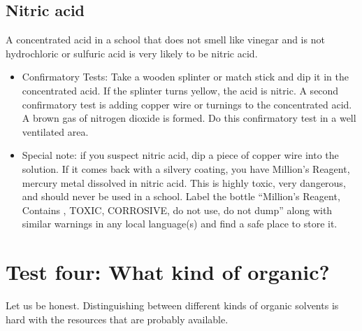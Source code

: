 \subsection{Nitric acid}
A concentrated acid in a school that does not smell like vinegar 
and is not hydrochloric or sulfuric acid is very likely to be nitric acid. 

\begin{itemize}

\item{Confirmatory Tests: Take a wooden splinter 
or match stick and dip it in the concentrated acid. 
If the splinter turns yellow, 
the acid is nitric. 
A second confirmatory test is adding copper wire 
or turnings to the concentrated acid. 
A brown gas of nitrogen dioxide is formed. 
Do this confirmatory test in a well ventilated area.}

\item{Special note: if you suspect nitric acid, 
dip a piece of copper wire into the solution. 
If it comes back with a silvery coating, 
you have Million’s Reagent, 
mercury metal dissolved in nitric acid. 
This is highly toxic, 
very dangerous, 
and should never be used in a school. 
Label the bottle “Million’s Reagent, 
Contains , 
TOXIC, 
CORROSIVE, 
do not use, 
do not dump” along with similar warnings 
in any local language(s) and find a safe place to store it.}

\end{itemize}

\section{Test four: What kind of organic?}
\label{sec:testorganic}
Let us be honest. 
Distinguishing between different kinds of organic solvents 
is hard with the resources that are probably available. 

